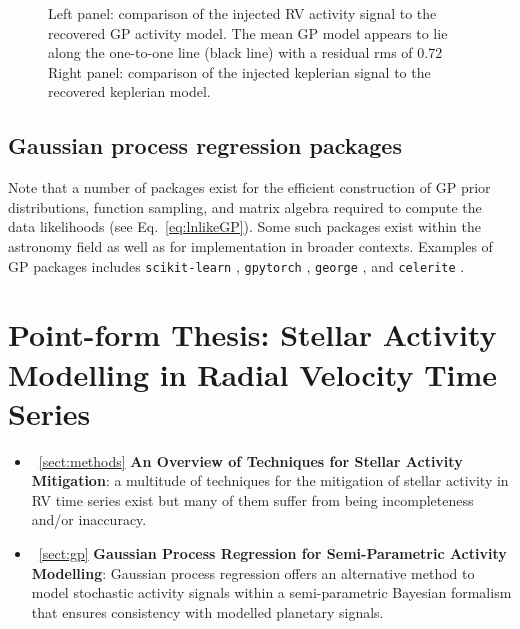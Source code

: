 \begin{figure}
  \centering
  \caption[Comparison of injected to recovered RV signals.]
          {Left panel: comparison of the injected RV activity signal to the recovered GP activity model.
            The mean GP model appears to lie along the one-to-one line (black line) with a residual rms
            of 0.72  Right panel:
          comparison of the injected keplerian signal to the recovered keplerian model. }
  \label{fig:RVcomp}
\end{figure}


\subsection{Gaussian process regression packages}
Note that a number of packages exist for the efficient construction of GP prior distributions, function
sampling, and matrix algebra required to compute the data likelihoods (see Eq.~\ref{eq:lnlikeGP}).
Some such packages exist within the astronomy field as well as for implementation in broader contexts.
Examples of GP packages includes \texttt{scikit-learn} \citep{sklearn},
\texttt{gpytorch} \citep{gardner18,wang19},
\texttt{george} \citep{ambikasaran14,foremanmackey15b}, and
\texttt{celerite} \citep{foremanmackey17}.


\section{Point-form Thesis: Stellar Activity Modelling in Radial Velocity
  Time Series}
\begin{itemize}
\renewcommand\labelitemi{--}
\item~\ref{sect:methods} \textbf{An Overview of Techniques for Stellar Activity
  Mitigation}: a multitude of techniques for the mitigation of stellar activity in RV time series exist
  but many of them suffer from being incompleteness and/or inaccuracy.
\item~\ref{sect:gp} \textbf{Gaussian Process Regression for Semi-Parametric
  Activity Modelling}: Gaussian process regression offers an alternative method to model
  stochastic activity signals within a semi-parametric Bayesian formalism that ensures consistency
  with modelled planetary signals.
\end{itemize}
